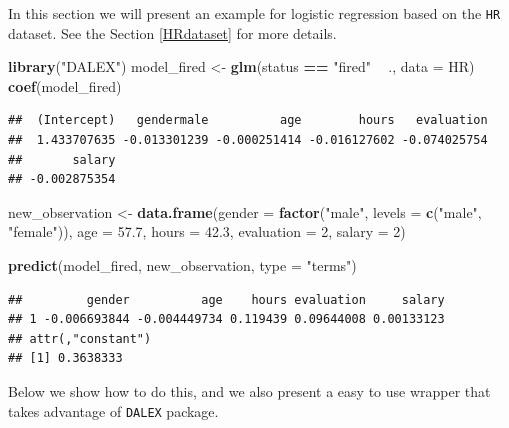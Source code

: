 \documentclass[]{krantz}
\newenvironment{Shaded}{\begin{snugshade}}{\end{snugshade}}
\newcommand{\DataTypeTok}[1]{\textcolor[rgb]{0.13,0.29,0.53}{#1}}
\newcommand{\DecValTok}[1]{\textcolor[rgb]{0.00,0.00,0.81}{#1}}
\newcommand{\FloatTok}[1]{\textcolor[rgb]{0.00,0.00,0.81}{#1}}
\newcommand{\KeywordTok}[1]{\textcolor[rgb]{0.13,0.29,0.53}{\textbf{#1}}}
\newcommand{\NormalTok}[1]{#1}
\newcommand{\OperatorTok}[1]{\textcolor[rgb]{0.81,0.36,0.00}{\textbf{#1}}}
\newcommand{\StringTok}[1]{\textcolor[rgb]{0.31,0.60,0.02}{#1}}
\theoremstyle{definition}
\theoremstyle{definition}
\theoremstyle{definition}
\theoremstyle{remark}
\begin{document}
In this section we will present an example for logistic regression based
on the \texttt{HR} dataset. See the Section \ref{HRdataset} for more
details.

\begin{Shaded}
\begin{Highlighting}[]
\KeywordTok{library}\NormalTok{(}\StringTok{"DALEX"}\NormalTok{)}
\NormalTok{model_fired <-}\StringTok{ }\KeywordTok{glm}\NormalTok{(status }\OperatorTok{==}\StringTok{ "fired"} \OperatorTok{~}\StringTok{ }\NormalTok{., }\DataTypeTok{data =}\NormalTok{ HR)}
\KeywordTok{coef}\NormalTok{(model_fired)}
\end{Highlighting}
\end{Shaded}

\begin{verbatim}
##  (Intercept)   gendermale          age        hours   evaluation 
##  1.433707635 -0.013301239 -0.000251414 -0.016127602 -0.074025754 
##       salary 
## -0.002875354
\end{verbatim}

\begin{Shaded}
\begin{Highlighting}[]
\NormalTok{new_observation <-}\StringTok{ }\KeywordTok{data.frame}\NormalTok{(}\DataTypeTok{gender =} \KeywordTok{factor}\NormalTok{(}\StringTok{"male"}\NormalTok{, }\DataTypeTok{levels =} \KeywordTok{c}\NormalTok{(}\StringTok{"male"}\NormalTok{, }\StringTok{"female"}\NormalTok{)),}
                      \DataTypeTok{age =} \FloatTok{57.7}\NormalTok{,}
                      \DataTypeTok{hours =} \FloatTok{42.3}\NormalTok{,}
                      \DataTypeTok{evaluation =} \DecValTok{2}\NormalTok{,}
                      \DataTypeTok{salary =} \DecValTok{2}\NormalTok{)}

\KeywordTok{predict}\NormalTok{(model_fired, new_observation, }\DataTypeTok{type =} \StringTok{"terms"}\NormalTok{)}
\end{Highlighting}
\end{Shaded}

\begin{verbatim}
##         gender          age    hours evaluation     salary
## 1 -0.006693844 -0.004449734 0.119439 0.09644008 0.00133123
## attr(,"constant")
## [1] 0.3638333
\end{verbatim}

Below we show how to do this, and we also present a easy to use wrapper
that takes advantage of \texttt{DALEX} package.
\end{document}
